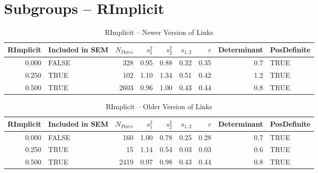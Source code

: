 \documentclass{article}\usepackage{graphicx, color}
\begin{document}
\section{Subgroups --  RImplicit }%
\begin{table}[ht]
\centering
\begin{tabular}{rlrrrrrrl}
  \hline
RImplicit & Included in SEM & $N_{Pairs}$ & $s_1^2$ & $s_2^2$ & $s_{1,2}$ & $r$ & Determinant & PosDefinite \\ 
  \hline
0.000 & FALSE & 328 & 0.95 & 0.88 & 0.32 & 0.35 & 0.7 & TRUE \\ 
  0.250 & TRUE & 102 & 1.10 & 1.34 & 0.51 & 0.42 & 1.2 & TRUE \\ 
  0.500 & TRUE & 2603 & 0.96 & 1.00 & 0.43 & 0.44 & 0.8 & TRUE \\ 
   \hline
\end{tabular}
\caption{RImplicit -- Newer Version of Links} 
\end{table}
\begin{table}[ht]
\centering
\begin{tabular}{rlrrrrrrl}
  \hline
RImplicit & Included in SEM & $N_{Pairs}$ & $s_1^2$ & $s_2^2$ & $s_{1,2}$ & $r$ & Determinant & PosDefinite \\ 
  \hline
0.000 & FALSE & 160 & 1.00 & 0.78 & 0.25 & 0.28 & 0.7 & TRUE \\ 
  0.250 & TRUE & 15 & 1.14 & 0.54 & 0.03 & 0.03 & 0.6 & TRUE \\ 
  0.500 & TRUE & 2419 & 0.97 & 0.98 & 0.43 & 0.44 & 0.8 & TRUE \\ 
   \hline
\end{tabular}
\caption{RImplicit -- Older Version of Links} 
\end{table}
\end{document}
